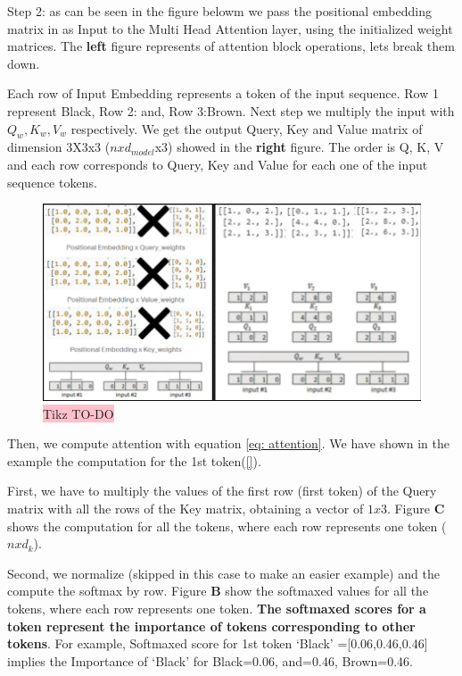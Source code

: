 Step 2: as can be seen in the figure belowm we pass the positional embedding matrix in as Input to the Multi Head Attention layer, using the initialized weight matrices. The \textbf{left} figure represents of attention block operations, lets break them down. 

Each row of Input Embedding represents a token of the input sequence. Row 1 represent Black, Row 2: and, Row 3:Brown. Next step we multiply the input with $Q_w, K_w,  V_w$ respectively. We get the output Query, Key and Value matrix  of dimension 3X3x3 ($n x d_{model}$x3) showed in the \textbf{right}  figure. The order is Q, K, V and each row corresponds to Query, Key and Value for each one of the input sequence tokens.

\begin{figure}[H]
    \centering
    \includegraphics[width=\linewidth]{tikz/Attention Example 2.png}
    \caption{{\color{red}\colorbox{pink}{Tikz TO-DO}} }
    \label{fig: transformer-attention-block}
\end{figure}



Then, we compute attention with equation \ref{eq: attention}. We have shown in the example the computation for the 1st token(\ref{}). 

First, we have to multiply the values of the first row (first token) of the Query matrix with all the rows of the Key matrix, obtaining a vector of $1x3$. Figure \textbf{C} shows the computation for all the tokens, where each row represents one token ($nxd_k$).

Second, we normalize (skipped in this case to make an easier example) and the compute the softmax by row. Figure \textbf{B} show the softmaxed values for all the tokens, where each row represents one token. \textbf{The softmaxed scores for a token represent the importance of tokens corresponding to other tokens}. For example, Softmaxed score for 1st token ‘Black’ =[0.06,0.46,0.46] implies the Importance of ‘Black’ for Black=0.06, and=0.46, Brown=0.46.

